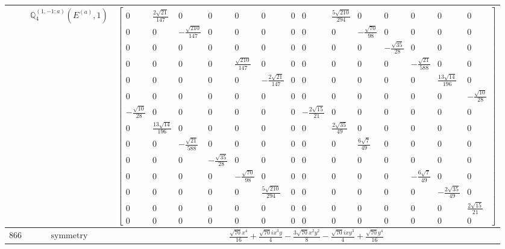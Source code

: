 \documentclass[fleqn,8pt,landscape]{jsarticle}
\begin{document}
\begin{longtable}{ccc}
$  $ & $ \mathbb{Q}_{4}^{(1,-1;a)}(E^{(a)},1) $ & $ \begin{bmatrix} 0 & \frac{2 \sqrt{21}}{147} & 0 & 0 & 0 & 0 & 0 & 0 & \frac{5 \sqrt{210}}{294} & 0 & 0 & 0 & 0 & 0 \\ 0 & 0 & - \frac{\sqrt{210}}{147} & 0 & 0 & 0 & 0 & 0 & 0 & - \frac{\sqrt{70}}{98} & 0 & 0 & 0 & 0 \\ 0 & 0 & 0 & 0 & 0 & 0 & 0 & 0 & 0 & 0 & - \frac{\sqrt{35}}{28} & 0 & 0 & 0 \\ 0 & 0 & 0 & 0 & \frac{\sqrt{210}}{147} & 0 & 0 & 0 & 0 & 0 & 0 & - \frac{\sqrt{21}}{588} & 0 & 0 \\ 0 & 0 & 0 & 0 & 0 & - \frac{2 \sqrt{21}}{147} & 0 & 0 & 0 & 0 & 0 & 0 & \frac{13 \sqrt{14}}{196} & 0 \\ 0 & 0 & 0 & 0 & 0 & 0 & 0 & 0 & 0 & 0 & 0 & 0 & 0 & - \frac{\sqrt{10}}{28} \\ - \frac{\sqrt{10}}{28} & 0 & 0 & 0 & 0 & 0 & 0 & - \frac{2 \sqrt{15}}{21} & 0 & 0 & 0 & 0 & 0 & 0 \\ 0 & \frac{13 \sqrt{14}}{196} & 0 & 0 & 0 & 0 & 0 & 0 & \frac{2 \sqrt{35}}{49} & 0 & 0 & 0 & 0 & 0 \\ 0 & 0 & - \frac{\sqrt{21}}{588} & 0 & 0 & 0 & 0 & 0 & 0 & \frac{6 \sqrt{7}}{49} & 0 & 0 & 0 & 0 \\ 0 & 0 & 0 & - \frac{\sqrt{35}}{28} & 0 & 0 & 0 & 0 & 0 & 0 & 0 & 0 & 0 & 0 \\ 0 & 0 & 0 & 0 & - \frac{\sqrt{70}}{98} & 0 & 0 & 0 & 0 & 0 & 0 & - \frac{6 \sqrt{7}}{49} & 0 & 0 \\ 0 & 0 & 0 & 0 & 0 & \frac{5 \sqrt{210}}{294} & 0 & 0 & 0 & 0 & 0 & 0 & - \frac{2 \sqrt{35}}{49} & 0 \\ 0 & 0 & 0 & 0 & 0 & 0 & 0 & 0 & 0 & 0 & 0 & 0 & 0 & \frac{2 \sqrt{15}}{21} \\ 0 & 0 & 0 & 0 & 0 & 0 & 0 & 0 & 0 & 0 & 0 & 0 & 0 & 0 \end{bmatrix} $ \\ \hline
$ 866 $ & $ \text{symmetry} $ & $ \frac{\sqrt{70} x^{4}}{16} + \frac{\sqrt{70} i x^{3} y}{4} - \frac{3 \sqrt{70} x^{2} y^{2}}{8} - \frac{\sqrt{70} i x y^{3}}{4} + \frac{\sqrt{70} y^{4}}{16} $ \\

\end{longtable}
\end{document}
